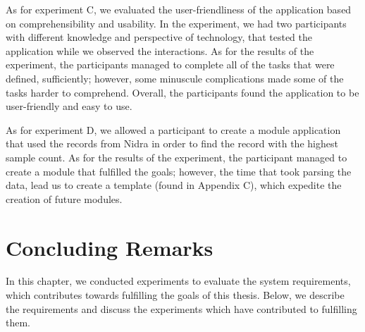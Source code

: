 As for experiment C, we evaluated the user-friendliness of the application based on comprehensibility and usability. In the experiment, we had two participants with different knowledge and perspective of technology, that tested the application while we observed the interactions. As for the results of the experiment, the participants managed to complete all of the tasks that were defined, sufficiently; however, some minuscule complications made some of the tasks harder to comprehend. Overall, the participants found the application to be user-friendly and easy to use. 

As for experiment D, we allowed a participant to create a module application that used the records from Nidra in order to find the record with the highest sample count. As for the results of the experiment, the participant managed to create a module that fulfilled the goals; however, the time that took parsing the data, lead us to create a template (found in Appendix C), which expedite the creation of future modules. 


\section{Concluding Remarks}\label{eval:conc}
In this chapter, we conducted experiments to evaluate the system requirements, which contributes towards fulfilling the goals of this thesis.  Below, we describe the requirements and discuss the experiments which have contributed to fulfilling them. 

